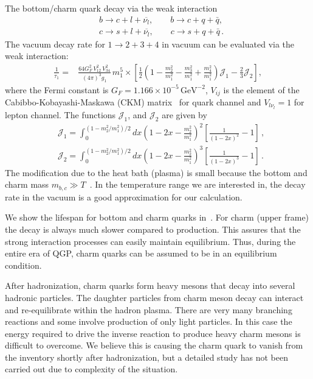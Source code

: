 The bottom/charm quark decay via the weak interaction  
\begin{align}
 &b\longrightarrow c+l+\overline{\nu_l}, \qquad b\longrightarrow c+q+\bar{q},\\
&c\longrightarrow s+l+\overline{\nu_l},\qquad c\longrightarrow s+q+\bar{q}\,.
\end{align}
The vacuum decay rate for $1\to2+3+4$ in vacuum can be evaluated via the weak interaction:
\begin{align}
\frac{1}{\tau_1}=&\frac{64G^2_F\,V^2_{12}\,V^2_{34}}{(4\pi)^3g_1}\,m^5_1\times\left[\frac{1}{2}{\left(1-\frac{m^2_2}{m^2_1}-\frac{m^2_3}{m^2_1}+\frac{m^2_4}{m^2_1}\right)}\mathcal{J}_1-\frac{2}{3}\mathcal{J}_2\right],
\end{align}
where the Fermi constant is $G_F=1.166\times10^{-5}\,\mathrm{GeV}^{-2}$, $V_{ij}$ is the element of the Cabibbo-Kobayashi-Maskawa (CKM) matrix~\cite{Czarnecki:2004cw} for quark channel and $V_{l\nu_l}=1$ for lepton channel. The functions $\mathcal{J}_1$, and $\mathcal{J}_2$ are given by
\begin{align}
&\mathcal{J}_1\!=\!\!\!\int_0^{(1-m^2_2/m^2_1)/2}\!\!\!\!\!\!\!\!dx\left(1\!-\!2x\!-\!\frac{m^2_2}{m_1^2}\right)^{\!\!2}\left[\frac{1}{(1-2x)^2}-1\right]\,,\\
&\mathcal{J}_2\!=\!\!\!\int_0^{(1-m^2_2/m^2_1)/2}\!\!\!\!\!\!\!\!dx\left(1\!-\!2x\!-\!\frac{m^2_2}{m_1^2}\right)^{\!\!3}\left[\frac{1}{(1-2x)^3}-1\right]
\,.
\end{align}
The modification due to the heat bath (plasma) is small because the bottom and charm mass $m_{b,c}\gg T$~\cite{Kuznetsova:2008jt}. In the temperature range we are interested in, the decay rate in the vacuum is a good approximation for our calculation. 

We show the lifespan for bottom and charm quarks in~. For charm (upper frame) the decay is always much slower compared to production. This assures that the strong interaction processes can easily maintain equilibrium. Thus, during the entire era of QGP, charm quarks can be assumed to be in an equilibrium condition. 

After hadronization, charm quarks form heavy mesons that decay into several hadronic particles. The daughter particles from charm meson decay can interact and re-equilibrate within the hadron plasma. There are very many branching reactions and some involve production of only light particles. In this case the energy required to drive the inverse reaction to produce heavy charm mesons is difficult to overcome. We believe this is causing the charm quark to vanish from the inventory shortly after hadronization, but a detailed study has not been carried out due to complexity of the situation. 

